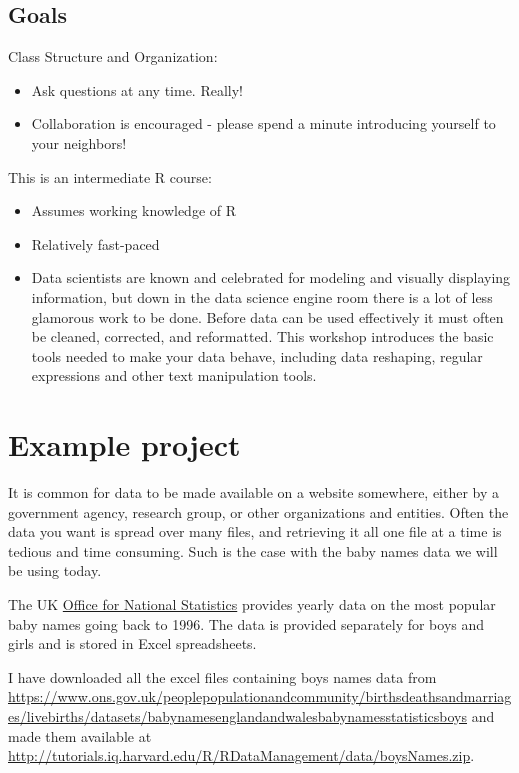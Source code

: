 \documentclass[]{book}
\providecommand{\tightlist}{%
  \setlength{\itemsep}{0pt}\setlength{\parskip}{0pt}}
\begin{document}
\subsection{Goals}\label{goals-3}

Class Structure and Organization:

\begin{itemize}
\tightlist
\item
  Ask questions at any time. Really!
\item
  Collaboration is encouraged - please spend a minute introducing
  yourself to your neighbors!
\end{itemize}

This is an intermediate R course:

\begin{itemize}
\tightlist
\item
  Assumes working knowledge of R
\item
  Relatively fast-paced
\item
  Data scientists are known and celebrated for modeling and visually
  displaying information, but down in the data science engine room there
  is a lot of less glamorous work to be done. Before data can be used
  effectively it must often be cleaned, corrected, and reformatted. This
  workshop introduces the basic tools needed to make your data behave,
  including data reshaping, regular expressions and other text
  manipulation tools.
\end{itemize}

\section{Example project}\label{example-project}

It is common for data to be made available on a website somewhere,
either by a government agency, research group, or other organizations
and entities. Often the data you want is spread over many files, and
retrieving it all one file at a time is tedious and time consuming. Such
is the case with the baby names data we will be using today.

The UK \href{https://www.ons.gov.uk}{Office for National Statistics}
provides yearly data on the most popular baby names going back to 1996.
The data is provided separately for boys and girls and is stored in
Excel spreadsheets.

I have downloaded all the excel files containing boys names data from
\url{https://www.ons.gov.uk/peoplepopulationandcommunity/birthsdeathsandmarriages/livebirths/datasets/babynamesenglandandwalesbabynamesstatisticsboys}
and made them available at
\url{http://tutorials.iq.harvard.edu/R/RDataManagement/data/boysNames.zip}.
\end{document}
